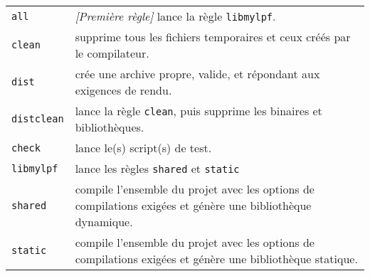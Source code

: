\bigskip

\begin{table}
\begin{tabular}{l p{12cm}}
\texttt{all} & \textit{[Première règle]} lance la règle \texttt{libmylpf}.\\
\texttt{clean} & supprime tous les fichiers temporaires et ceux créés par le compilateur.\\
\texttt{dist} & crée une archive propre, valide, et répondant aux exigences de rendu.\\
\texttt{distclean} & lance la règle \texttt{clean}, puis supprime les binaires et bibliothèques.\\
\texttt{check} & lance le(s) script(s) de test.\\
\texttt{libmylpf} & lance les règles \texttt{shared} et \texttt{static} \\
\texttt{shared} & compile l'ensemble du projet avec les options de compilations exigées et génère une bibliothèque dynamique.\\
\texttt{static} & compile l'ensemble du projet avec les options de compilations exigées et génère une bibliothèque statique.\\
\end{tabular}
\end{table}

\phantom{42}

\vfillFirst

\vfillLast
